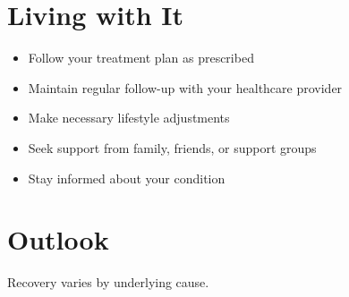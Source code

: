 \section{Living with It}
\begin{itemize}[noitemsep]
  \item Follow your treatment plan as prescribed
  \item Maintain regular follow-up with your healthcare provider
  \item Make necessary lifestyle adjustments
  \item Seek support from family, friends, or support groups
  \item Stay informed about your condition
\end{itemize}
\section{Outlook}
Recovery varies by underlying cause.
